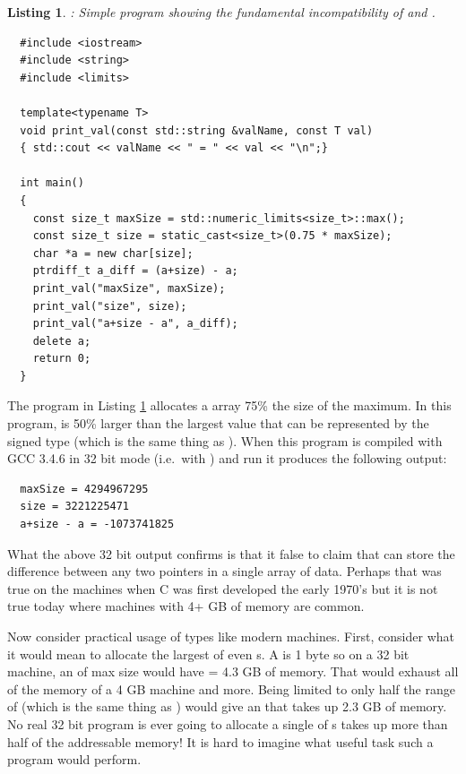\documentclass[pdf,ps2pdf,11pt]{SANDreport}
\newtheorem{listing}{Listing}
\begin{document}
{}\begin{listing}: Simple program showing the fundamental
incompatibility of {} and {}.
\label{listing:size_t-ptrdiff_t-incompatibility}
{\small\begin{verbatim}
  #include <iostream> 
  #include <string> 
  #include <limits> 
   
  template<typename T> 
  void print_val(const std::string &valName, const T val) 
  { std::cout << valName << " = " << val << "\n";} 
   
  int main() 
  { 
    const size_t maxSize = std::numeric_limits<size_t>::max(); 
    const size_t size = static_cast<size_t>(0.75 * maxSize); 
    char *a = new char[size]; 
    ptrdiff_t a_diff = (a+size) - a; 
    print_val("maxSize", maxSize); 
    print_val("size", size); 
    print_val("a+size - a", a_diff); 
    delete a;
    return 0; 
  }
\end{verbatim}}
\end{listing}


The program in Listing
{}\ref{listing:size_t-ptrdiff_t-incompatibility} allocates a
{} array 75\% the size of the maximum.  In this program,
{} is 50\% larger than the largest value that can be
represented by the signed type {} (which is the same
thing as {}).  When this program is compiled with GCC 3.4.6
in 32 bit mode (i.e.\ with {}) and run it produces the
following output:

{\small\begin{verbatim}
  maxSize = 4294967295
  size = 3221225471
  a+size - a = -1073741825
\end{verbatim}}

What the above 32 bit output confirms is that it false to claim that
{} can store the difference between any two pointers
in a single array of data.  Perhaps that was true on the machines when
C was first developed the early 1970's but it is not true today where
machines with 4+ GB of memory are common.

Now consider practical usage of types like {} modern
machines.  First, consider what it would mean to allocate the largest
{} of even {}s.  A {} is 1 byte
so on a 32 bit machine, an {} of max size would
have {} = 4.3 GB of memory.  That would exhaust
all of the memory of a 4 GB machine and more.  Being limited to only
half the range of {} (which is the same thing as
{}) would give an {} that takes
up 2.3 GB of memory.  No real 32 bit program is ever going to allocate
a single {} of {}s takes up more than half
of the addressable memory!  It is hard to imagine what useful task
such a program would perform.
\end{document}
